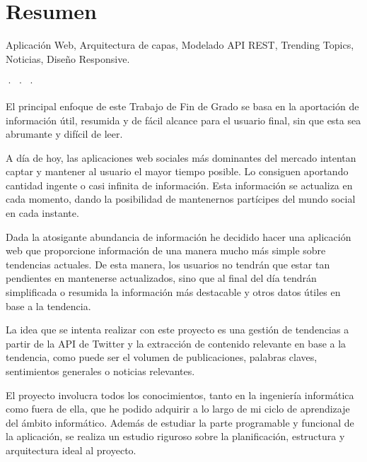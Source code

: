 \begingroup

\chapter*{Resumen}

\noindent{} Aplicación Web, Arquitectura de capas, Modelado API REST, Trending Topics, Noticias, Diseño Responsive.
\begin{center}
· · ·
\end{center}

El principal enfoque de este Trabajo de Fin de Grado se basa en la aportación de información útil, resumida y de fácil alcance para el usuario final, sin que esta sea abrumante y difícil de leer.

\vspace{0.3cm}

A día de hoy, las aplicaciones web sociales más dominantes del mercado intentan captar y mantener al usuario el mayor tiempo posible. Lo consiguen aportando cantidad ingente o casi infinita de información. Esta información se actualiza en cada momento, dando la posibilidad de mantenernos partícipes del mundo social en cada instante.

\vspace{0.3cm}

Dada la atosigante abundancia de información he decidido hacer una aplicación web que proporcione información de una manera mucho más simple sobre tendencias actuales. De esta manera, los usuarios no tendrán que estar tan pendientes en mantenerse actualizados, sino que al final del día tendrán simplificada o resumida la información más destacable y otros datos útiles en base a la tendencia.

\vspace{0.3cm}

La idea que se intenta realizar con este proyecto es una gestión de tendencias a partir de la API de Twitter y la extracción de contenido relevante en base a la tendencia, como puede ser el volumen de publicaciones, palabras claves, sentimientos generales o noticias relevantes.

\vspace{0.3cm}

El proyecto involucra todos los conocimientos, tanto en la ingeniería informática como fuera de ella, que he podido adquirir a lo largo de mi ciclo de aprendizaje del ámbito informático. Además de estudiar la parte programable y funcional de la aplicación, se realiza un estudio riguroso sobre la planificación, estructura y arquitectura ideal al proyecto.

